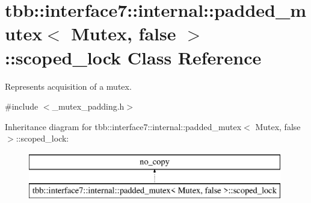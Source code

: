 \hypertarget{classtbb_1_1interface7_1_1internal_1_1padded__mutex_3_01Mutex_00_01false_01_4_1_1scoped__lock}{}\section{tbb\+:\+:interface7\+:\+:internal\+:\+:padded\+\_\+mutex$<$ Mutex, false $>$\+:\+:scoped\+\_\+lock Class Reference}
\label{classtbb_1_1interface7_1_1internal_1_1padded__mutex_3_01Mutex_00_01false_01_4_1_1scoped__lock}


Represents acquisition of a mutex.  




{\ttfamily \#include $<$\+\_\+mutex\+\_\+padding.\+h$>$}

Inheritance diagram for tbb\+:\+:interface7\+:\+:internal\+:\+:padded\+\_\+mutex$<$ Mutex, false $>$\+:\+:scoped\+\_\+lock\+:\begin{figure}[H]
\begin{center}
\leavevmode
\includegraphics[height=2.000000cm]{classtbb_1_1interface7_1_1internal_1_1padded__mutex_3_01Mutex_00_01false_01_4_1_1scoped__lock}
\end{center}
\end{figure}
